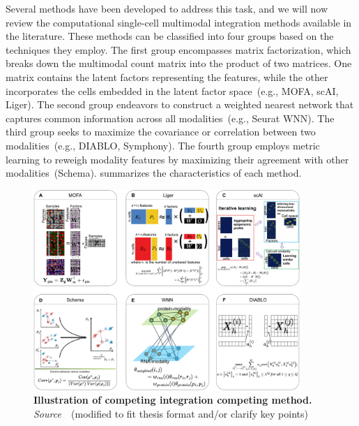 Several methods have been developed to address this task, and we will now review the computational single-cell multimodal integration methods available in the literature. These methods can be classified into four groups based on the techniques they employ. The first group encompasses matrix factorization, which breaks down the multimodal count matrix into the product of two matrices. One matrix contains the latent factors representing the features, while the other incorporates the cells embedded in the latent factor space~(e.g., MOFA, scAI, Liger). The second group endeavors to construct a weighted nearest network that captures common information across all modalities~(e.g., Seurat WNN). The third group seeks to maximize the covariance or correlation between two modalities~(e.g., DIABLO, Symphony). The fourth group employs metric learning to reweigh modality features by maximizing their agreement with other modalities~(Schema).  summarizes the characteristics of each method.
 \begin{figure}[!h]
  	\centering
  	\includegraphics[width=0.9\textwidth]{Alg/fig}
  	\vspace{0.1cm}
  	\caption[Illustration of competing integration competing method.]{\textbf{Illustration of competing integration competing method.} \emph{Source~\cite{kriebel2022uinmf}}~(modified to fit thesis format and/or clarify key points)
  }
  	\label{fig:Alg}
 \end{figure}



